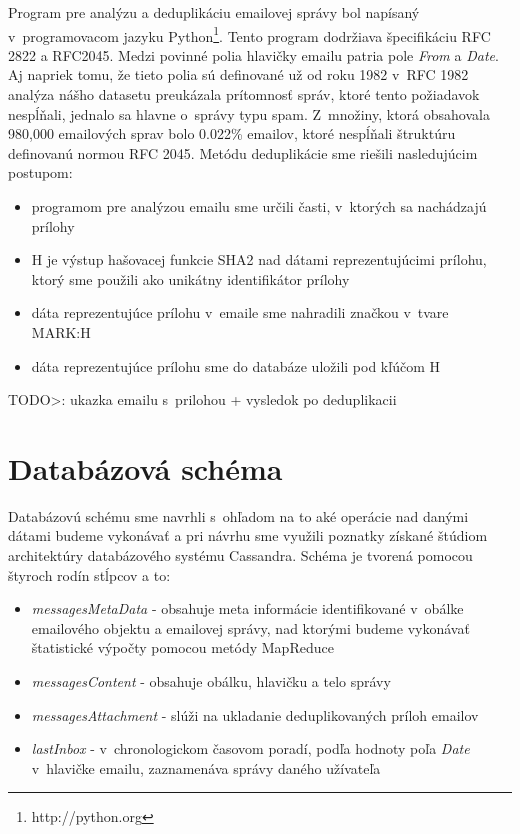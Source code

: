 \documentclass[11pt,twoside,a4paper]{book}
\begin{document}
Program pre analýzu a deduplikáciu emailovej správy bol napísaný v~programovacom jazyku Python\footnote{http://python.org}. Tento program dodržiava špecifikáciu RFC 2822 a RFC2045. 
Medzi povinné polia hlavičky emailu patria pole \emph{From} a \emph{Date}. Aj napriek tomu, že tieto polia sú definované už od roku 1982 v~RFC 1982 analýza nášho datasetu preukázala prítomnosť správ, ktoré tento požiadavok nespĺňali, jednalo sa hlavne o~správy typu spam. Z~množiny, ktorá obsahovala 980,000 emailových sprav bolo 0.022\% emailov, ktoré nespĺňali štruktúru definovanú normou RFC 2045. Metódu deduplikácie sme riešili nasledujúcim postupom:

\begin{itemize}
 \item programom pre analýzou emailu sme určili časti, v~ktorých sa nachádzajú prílohy
 \item H je výstup hašovacej funkcie SHA2 nad dátami reprezentujúcimi prílohu, ktorý sme použili ako unikátny identifikátor prílohy
 \item dáta reprezentujúce prílohu v~emaile sme nahradili značkou v~tvare MARK:H
 \item dáta reprezentujúce prílohu sme do databáze uložili pod kľúčom H
\end{itemize}


TODO>:
ukazka emailu s~prilohou + vysledok po deduplikacii
\section{Databázová schéma}

Databázovú schému sme navrhli s~ohľadom na to aké operácie nad danými dátami budeme vykonávať a pri návrhu sme využili poznatky získané štúdiom architektúry databázového systému Cassandra. Schéma je tvorená pomocou štyroch rodín stĺpcov a to:

\begin{itemize}
 \item \emph{messagesMetaData} - obsahuje meta informácie identifikované v~obálke emailového objektu a emailovej správy, nad ktorými budeme vykonávať štatistické výpočty pomocou metódy MapReduce
 \item \emph{messagesContent} - obsahuje obálku, hlavičku a telo správy
 \item \emph{messagesAttachment} - slúži na ukladanie deduplikovaných príloh emailov  
 \item \emph{lastInbox} - v~chronologickom časovom poradí, podľa hodnoty poľa \emph{Date} v~hlavičke emailu, zaznamenáva správy daného užívateľa
\end{itemize}
\end{document}
